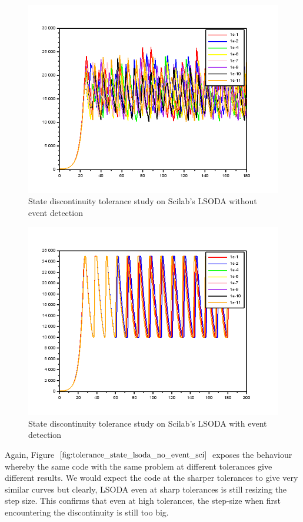 \begin{figure}[h]
	\centering
	\includegraphics[width=0.7\linewidth]{./figures/tolerance_state_lsoda_no_event_sci}
	\caption{State discontinuity tolerance study on Scilab's LSODA without event detection}
	\label{fig:tolerance_state_lsoda_no_event_sci}
\end{figure}

\begin{figure}[h]
	\centering
	\includegraphics[width=0.7\linewidth]{./figures/tolerance_state_lsoda_with_event_sci}
	\caption{State discontinuity tolerance study on Scilab's LSODA with event detection}
	\label{fig:tolerance_state_lsoda_with_event_sci}
\end{figure}

Again, Figure $\ref{fig:tolerance_state_lsoda_no_event_sci}$ exposes the behaviour whereby the same code with the same problem at different tolerances give different results. We would expect the code at the sharper tolerances to give very similar curves but clearly, LSODA even at sharp tolerances is still resizing the step size. This confirms that even at high tolerances, the step-size when first encountering the discontinuity is still too big.

